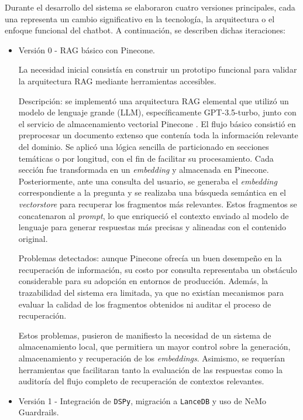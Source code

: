 Durante el desarrollo del sistema se elaboraron cuatro versiones principales, cada una representa un cambio significativo en la tecnología, la arquitectura o el enfoque funcional del chatbot. A continuación, se describen dichas iteraciones:
\vspace{1em}
\begin{itemize}
\item{Versión 0 - RAG básico con Pinecone.}

    La necesidad inicial consistía en construir un prototipo funcional para validar la arquitectura RAG mediante herramientas accesibles.


    Descripción: se implementó una arquitectura RAG elemental que utilizó un modelo de lenguaje grande (LLM), específicamente GPT-3.5-turbo, junto con el servicio de almacenamiento vectorial Pinecone \citep{vectorestoredefinition}. El flujo básico consistió en preprocesar un documento extenso que contenía toda la información relevante del dominio. Se aplicó una lógica sencilla de particionado en secciones temáticas o por longitud, con el fin de facilitar su procesamiento. Cada sección fue transformada en un \textit{embedding} y almacenada en Pinecone. Posteriormente, ante una consulta del usuario, se generaba el \textit{embedding} correspondiente a la pregunta y se realizaba una búsqueda semántica en el \textit{vectorstore} para recuperar los fragmentos más relevantes. Estos fragmentos se concatenaron al \textit{prompt}, lo que enriqueció el contexto enviado al modelo de lenguaje para generar respuestas más precisas y alineadas con el contenido original.


    Problemas detectados: aunque Pinecone ofrecía un buen desempeño en la recuperación de información, su costo por consulta representaba un obstáculo considerable para su adopción en entornos de producción. Además, la trazabilidad del sistema era limitada, ya que no existían mecanismos para evaluar la calidad de los fragmentos obtenidos ni auditar el proceso de recuperación.

    Estos problemas, pusieron de manifiesto la necesidad de un sistema de almacenamiento local, que permitiera un mayor control sobre la generación, almacenamiento y recuperación de los \textit{embeddings}. Asimismo, se requerían herramientas que facilitaran tanto la evaluación de las respuestas como la auditoría del flujo completo de recuperación de contextos relevantes.

\vspace{1em}
\item{Versión 1 - Integración de \texttt{DSPy}, migración a \texttt{LanceDB} y uso de NeMo Guardrails.}


\end{itemize}
